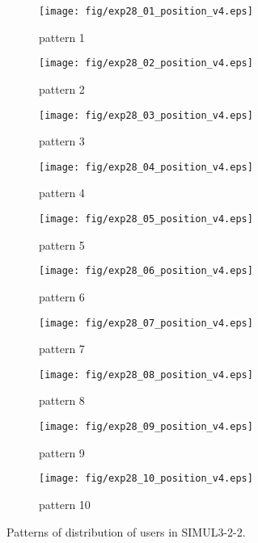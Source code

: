 \begin{figure}
	\begin{center}
		\begin{subfigure}[b]{0.32\textwidth}
			\texttt{[image: fig/exp28\_01\_position\_v4.eps]}
			\caption{pattern 1}
			\label{figure:simul3_2_2_a}
		\end{subfigure}
		\begin{subfigure}[b]{0.32\textwidth}
			\texttt{[image: fig/exp28\_02\_position\_v4.eps]}
			\caption{pattern 2}
			\label{figure:simul3_2_2_b}
		\end{subfigure}
		\begin{subfigure}[b]{0.32\textwidth}
			\texttt{[image: fig/exp28\_03\_position\_v4.eps]}
			\caption{pattern 3}
			\label{figure:simul3_2_2_c}
		\end{subfigure}
		\begin{subfigure}[b]{0.32\textwidth}
			\texttt{[image: fig/exp28\_04\_position\_v4.eps]}
			\caption{pattern 4}
			\label{figure:simul3_2_2_d}
		\end{subfigure}
		\begin{subfigure}[b]{0.32\textwidth}
			\texttt{[image: fig/exp28\_05\_position\_v4.eps]}
			\caption{pattern 5}
			\label{figure:simul3_2_2_e}
		\end{subfigure}
		\begin{subfigure}[b]{0.32\textwidth}
			\texttt{[image: fig/exp28\_06\_position\_v4.eps]}
			\caption{pattern 6}
			\label{figure:simul3_2_2_f}
		\end{subfigure}
		\begin{subfigure}[b]{0.32\textwidth}
			\texttt{[image: fig/exp28\_07\_position\_v4.eps]}
			\caption{pattern 7}
			\label{figure:simul3_2_2_g}
		\end{subfigure}
		\begin{subfigure}[b]{0.32\textwidth}
			\texttt{[image: fig/exp28\_08\_position\_v4.eps]}
			\caption{pattern 8}
			\label{figure:simul3_2_2_h}
		\end{subfigure}
		\begin{subfigure}[b]{0.32\textwidth}
			\texttt{[image: fig/exp28\_09\_position\_v4.eps]}
			\caption{pattern 9}
			\label{figure:simul3_2_2_i}
		\end{subfigure}
		\begin{subfigure}[b]{0.32\textwidth}
			\texttt{[image: fig/exp28\_10\_position\_v4.eps]}
			\caption{pattern 10}
			\label{figure:simul3_2_2_j}
		\end{subfigure}
		\caption{Patterns of distribution of users in SIMUL3-2-2.}
		\label{figure:simul3_2_2_p}
	\end{center}
\end{figure}

